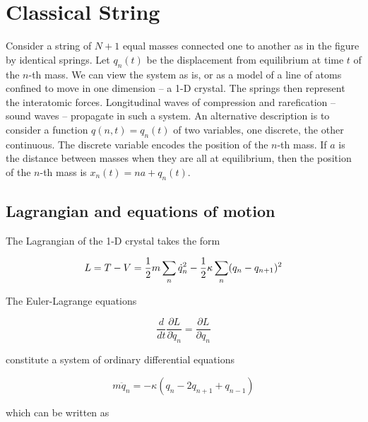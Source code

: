 

\setcounter{section}{15}

\section{Classical String}

\innertableofcontents

Consider a string of $N+1$ equal masses connected one to another as in the figure by identical springs.  Let $q_n(t)$ be the displacement from equilibrium at time $t$ of the $n$-th mass.  We can view the system as is, or as a model of a line of atoms confined to move in one dimension -- a 1-D crystal.  The springs then represent the interatomic forces.  Longitudinal waves of compression and rarefication -- sound waves -- propagate in such a system.  An alternative description is to consider a function $q(n,t) = q_n(t)$ of two variables, one discrete, the other continuous.  The discrete variable encodes the position of the $n$-th mass.  If $a$ is the distance between masses when they are all at equilibrium, then the position of the $n$-th mass is $x_n(t) = na + q_n(t)$.





\subsection{ Lagrangian and equations of motion}

The Lagrangian of the 1-D crystal takes the form

\begin{equation}
L = T - V = \small{\frac{1}{2}} m \sum_n \dot q_n^2 - \small{\frac{1}{2}} \kappa \sum_n (q_n - q_{n+1})^2
\end{equation}

The Euler-Lagrange equations

\begin{equation}
\frac{d}{dt} \frac{\partial L}{\partial \dot q_n}
=  \frac{\partial L}{\partial q_n}
\end{equation}

constitute a system of ordinary differential equations

\begin{equation}
m\ddot q_n = - \kappa(q_n - 2q_{n+1}+ q_{n-1})
\end{equation}

which can be written as

